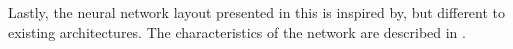 

Lastly, the neural network layout presented in this \thesisdiss is inspired by, but different to existing architectures. The characteristics of the network are described in .
